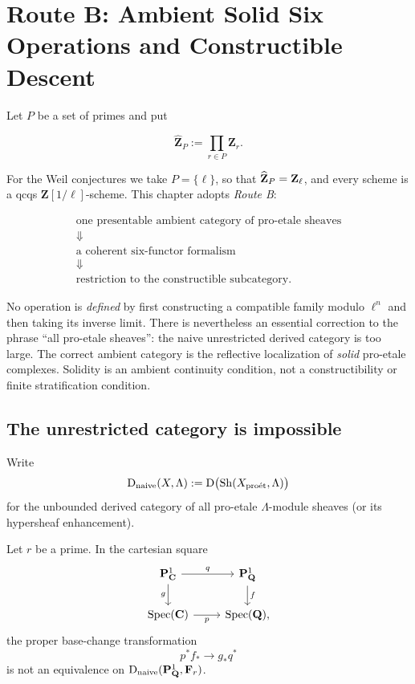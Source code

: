 \chapter{Route B: Ambient Solid Six Operations and Constructible Descent}
\label{chap:proetale-six}

Let \(P\) be a set of primes and put

\[
  \widehat{\mathbf Z}_{P}:=\prod_{r\in P}\mathbf Z_r.
\]

For the Weil conjectures we take \(P=\{\ell\}\), so that
\(\widehat{\mathbf Z}_{P}=\mathbf Z_\ell\), and every scheme is a qcqs
\(\mathbf Z[1/\ell]\)-scheme.  This chapter adopts \emph{Route B}:

\[
\boxed{
 \begin{gathered}
 \text{one presentable ambient category of pro-etale sheaves}\\
 \Downarrow\\[-0.4em]
 \text{a coherent six-functor formalism}\\
 \Downarrow\\[-0.4em]
 \text{restriction to the constructible subcategory}.
 \end{gathered}}
\tag{4.B}\label{eq:route-b-overview}
\]

No operation is \emph{defined} by first constructing a compatible family
modulo \(\ell^n\) and then taking its inverse limit.  There is nevertheless
an essential correction to the phrase ``all pro-etale sheaves'': the naive
unrestricted derived category is too large.  The correct ambient category is
the reflective localization of \emph{solid} pro-etale complexes.  Solidity
is an ambient continuity condition, not a constructibility or finite
stratification condition.

\section{The unrestricted category is impossible}

Write
\[
 \mathrm D_{\mathrm{naive}}(X,\Lambda)
   :=\mathrm D\bigl(\operatorname{Sh}(X_{\mathrm{pro\acute et}},\Lambda)\bigr)
\]
for the unbounded derived category of all pro-etale \(\Lambda\)-module
sheaves (or its hypersheaf enhancement).

\begin{theorem}
\label{thm:naive-proetale-pbc-fails}
Let \(r\) be a prime.  In the cartesian square
\begin{equation}
\label{eq:naive-pbc-counterexample}
\begin{tikzcd}
 \PP^1_{\mathbf C} \arrow[r,"q"] \arrow[d,"g"'] &
 \PP^1_{\mathbf Q} \arrow[d,"f"] \\
 \Spec(\mathbf C) \arrow[r,"p"'] & \Spec(\mathbf Q),
\end{tikzcd}
\end{equation}
the proper base-change transformation
\[
 p^*f_*\longrightarrow g_*q^*
\]
is not an equivalence on
\(\mathrm D_{\mathrm{naive}}(\mathbf P^1_{\mathbf Q},\mathbf F_r)\).
\end{theorem}

